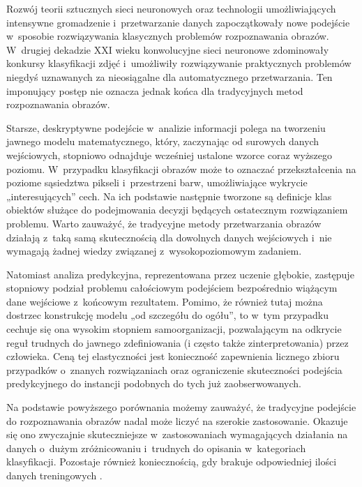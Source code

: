 Rozwój teorii sztucznych sieci neuronowych oraz technologii umożliwiających intensywne gromadzenie i~przetwarzanie danych zapoczątkowały nowe podejście w~sposobie rozwiązywania klasycznych problemów rozpoznawania obrazów. W~drugiej dekadzie XXI wieku konwolucyjne sieci neuronowe zdominowały konkursy klasyfikacji zdjęć \cite{imagenet} i~umożliwiły rozwiązywanie praktycznych problemów niegdyś uznawanych za nieosiągalne dla automatycznego przetwarzania. Ten imponujący postęp nie oznacza jednak końca dla tradycyjnych metod rozpoznawania obrazów.

Starsze, deskryptywne podejście w~analizie informacji polega na tworzeniu jawnego modelu matematycznego, który, zaczynając od surowych danych wejściowych, stopniowo odnajduje wcześniej ustalone wzorce coraz wyższego poziomu. W~przypadku klasyfikacji obrazów może to oznaczać przekształcenia na poziome sąsiedztwa pikseli i~przestrzeni barw, umożliwiające wykrycie „interesujących” cech. Na ich podstawie następnie tworzone są definicje klas obiektów służące do podejmowania decyzji będących ostatecznym rozwiązaniem problemu. Warto zauważyć, że tradycyjne metody przetwarzania obrazów działają z~taką samą skutecznością dla dowolnych danych wejściowych i~nie wymagają żadnej wiedzy związanej z~wysokopoziomowym zadaniem.

Natomiast analiza predykcyjna, reprezentowana przez uczenie głębokie, zastępuje stopniowy podział problemu całościowym podejściem bezpośrednio wiążącym dane wejściowe z~końcowym rezultatem. Pomimo, że również tutaj można dostrzec konstrukcję modelu „od szczegółu do ogółu”, to w~tym przypadku cechuje się ona wysokim stopniem samoorganizacji, pozwalającym na odkrycie reguł trudnych do jawnego zdefiniowania (i często także zinterpretowania) przez człowieka. Ceną tej elastyczności jest konieczność zapewnienia licznego zbioru przypadków o~znanych rozwiązaniach oraz ograniczenie skuteczności podejścia predykcyjnego do instancji podobnych do tych już zaobserwowanych.

Na podstawie powyższego porównania możemy zauważyć, że tradycyjne podejście do rozpoznawania obrazów nadal może liczyć na szerokie zastosowanie. Okazuje się ono zwyczajnie skuteczniejsze w~zastosowaniach wymagających działania na danych o~dużym zróżnicowaniu i~trudnych do opisania w~kategoriach klasyfikacji. Pozostaje również koniecznością, gdy brakuje odpowiedniej ilości danych treningowych \cite{walsh19}.

